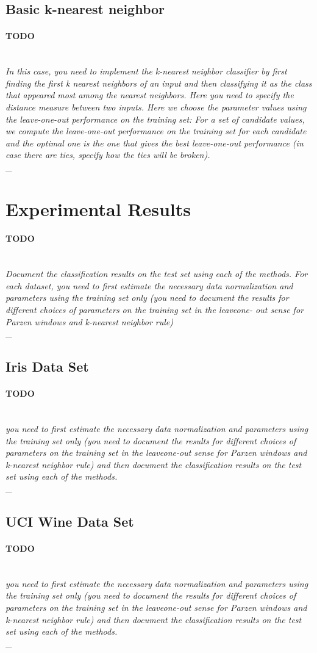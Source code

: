 \documentclass{article}
\newcommand{\outline}[2]{\paragraph{\textsc{#1}}\hrulefill~\\{\small\it #2}\\\_\hrulefill~\\}
\newcommand{\todo}[1]{\outline{\large TODO}{#1}}
\begin{document}
\subsection{Basic k-nearest neighbor}
\todo{In this case, you need to implement the k-nearest neighbor classifier by first finding the first k nearest neighbors of an input and then classifying it as the class that appeared most among the nearest neighbors. Here you need to specify the distance measure between two inputs. Here we choose the parameter values using the leave-one-out performance on the training set: For a set of candidate values, we compute the leave-one-out performance on the training set for each candidate and the optimal one is the one that gives the best leave-one-out performance (in case there are ties, specify how the ties will be broken).}

\section{Experimental Results}
\todo{Document the classification results on the test set using each of the methods. For each dataset, you need to first estimate the necessary data normalization and parameters using the training set only (you need to document the results for different choices of parameters on the training set in the leaveone- out sense for Parzen windows and k-nearest neighbor rule)}

\subsection{Iris Data Set}
\todo{you need to first estimate the necessary data normalization and parameters using the training set only (you need to document the results for different choices of parameters on the training set in the leaveone-out sense for Parzen windows and k-nearest neighbor rule) and then document the classification results on
the test set using each of the methods.}

\subsection{UCI Wine Data Set}
\todo{you need to first estimate the necessary data normalization and parameters using the training set only (you need to document the results for different choices of parameters on the training set in the leaveone-out sense for Parzen windows and k-nearest neighbor rule) and then document the classification results on
the test set using each of the methods.}
\end{document}
